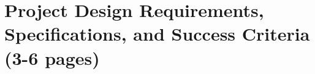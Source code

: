 \documentclass[12pt]{article}
\begin{document}
\section{Project Design Requirements, Specifications, and Success Criteria (3-6 pages)}

\end{document}
